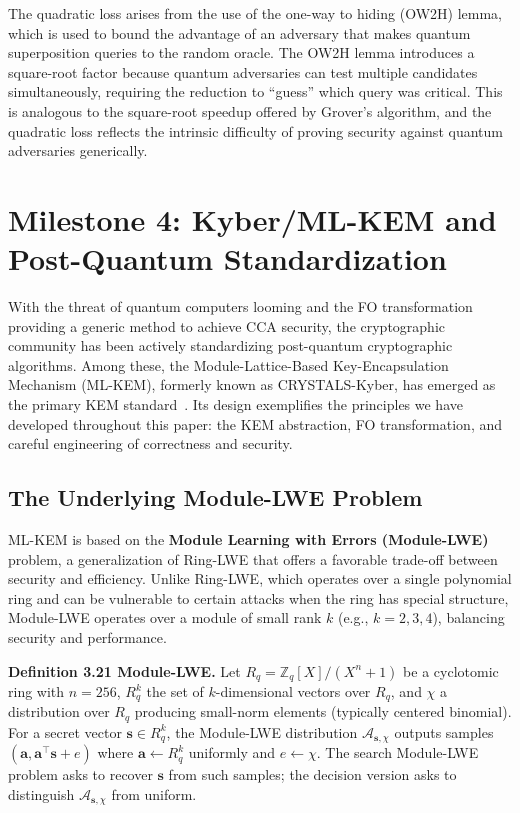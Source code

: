 The quadratic loss arises from the use of the one-way to hiding (OW2H) lemma, which is used to bound the advantage of an adversary that makes quantum superposition queries to the random oracle. The OW2H lemma introduces a square-root factor because quantum adversaries can test multiple candidates simultaneously, requiring the reduction to ``guess'' which query was critical. This is analogous to the square-root speedup offered by Grover's algorithm, and the quadratic loss reflects the intrinsic difficulty of proving security against quantum adversaries generically.

\section{Milestone 4: Kyber/ML-KEM and Post-Quantum Standardization}

With the threat of quantum computers looming and the FO transformation providing a generic method to achieve CCA security, the cryptographic community has been actively standardizing post-quantum cryptographic algorithms. Among these, the Module-Lattice-Based Key-Encapsulation Mechanism (ML-KEM), formerly known as CRYSTALS-Kyber, has emerged as the primary KEM standard~\cite{nist2024fips203}. Its design exemplifies the principles we have developed throughout this paper: the KEM abstraction, FO transformation, and careful engineering of correctness and security.

\subsection{The Underlying Module-LWE Problem}

ML-KEM is based on the \textbf{Module Learning with Errors (Module-LWE)} problem, a generalization of Ring-LWE that offers a favorable trade-off between security and efficiency. Unlike Ring-LWE, which operates over a single polynomial ring and can be vulnerable to certain attacks when the ring has special structure, Module-LWE operates over a module of small rank $k$ (e.g., $k=2,3,4$), balancing security and performance.

\noindent\textbf{Definition 3.21 Module-LWE.} Let $R_q = \mathbb{Z}_q[X]/(X^n + 1)$ be a cyclotomic ring with $n = 256$, ${R}_q^k$ the set of $k$-dimensional vectors over $R_q$, and $\chi$ a distribution over $R_q$ producing small-norm elements (typically centered binomial). For a secret vector $\boldsymbol{s} \in {R}_q^k$, the Module-LWE distribution $\mathcal{A}_{\boldsymbol{s},\chi}$ outputs samples $(\boldsymbol{a}, \boldsymbol{a}^\top \boldsymbol{s} + e)$ where $\boldsymbol{a} \gets {R}_q^k$ uniformly and $e \gets \chi$. The search Module-LWE problem asks to recover $\boldsymbol{s}$ from such samples; the decision version asks to distinguish $\mathcal{A}_{\boldsymbol{s},\chi}$ from uniform.

